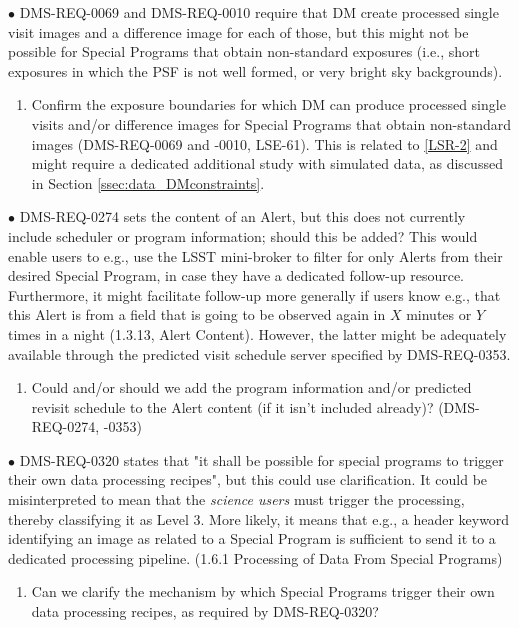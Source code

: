 \documentclass[DM,lsstdraft,toc]{lsstdoc}
\begin{document}
$\bullet$ DMS-REQ-0069 and DMS-REQ-0010 require that DM create processed single visit images and a difference image for each of those, but this might not be possible for Special Programs that obtain non-standard exposures (i.e., short exposures in which the PSF is not well formed, or very bright sky backgrounds). 
\begin{enumerate}[topsep=-10pt,after=\vspace{10pt},label= \textbf{Concern \Roman*.},resume] \item \label{DMSR-3} Confirm the exposure boundaries for which DM can produce processed single visits and/or difference images for Special Programs that obtain non-standard images (DMS-REQ-0069 and -0010, LSE-61). This is related to \ref{LSR-2} and might require a dedicated additional study with simulated data, as discussed in Section \ref{ssec:data_DMconstraints}. \end{enumerate}

$\bullet$ DMS-REQ-0274 sets the content of an Alert, but this does not currently include scheduler or program information; should this be added? This would enable users to e.g., use the LSST mini-broker to filter for only Alerts from their desired Special Program, in case they have a dedicated follow-up resource. Furthermore, it might facilitate follow-up more generally if users know e.g., that this Alert is from a field that is going to be observed again in $X$ minutes or $Y$ times in a night (1.3.13, Alert Content). However, the latter might be adequately available through the predicted visit schedule server specified by DMS-REQ-0353.
\begin{enumerate}[topsep=-10pt,after=\vspace{10pt},label= \textbf{Concern \Roman*.},resume] \item \label{DMSR-4} Could and/or should we add the program information and/or predicted revisit schedule to the Alert content (if it isn't included already)? (DMS-REQ-0274, -0353) \end{enumerate}

$\bullet$ DMS-REQ-0320 states that "it shall be possible for special programs to trigger their own data processing recipes", but this could use clarification. It could be misinterpreted to mean that the {\it science users} must trigger the processing, thereby classifying it as Level 3. More likely, it means that e.g., a header keyword identifying an image as related to a Special Program is sufficient to send it to a dedicated processing pipeline. (1.6.1 Processing of Data From Special Programs)
\begin{enumerate}[topsep=-10pt,after=\vspace{10pt},label= \textbf{Concern \Roman*.},resume] \item \label{DMSR-5} Can we clarify the mechanism by which Special Programs trigger their own data processing recipes, as required by DMS-REQ-0320? \end{enumerate}
\end{document}
